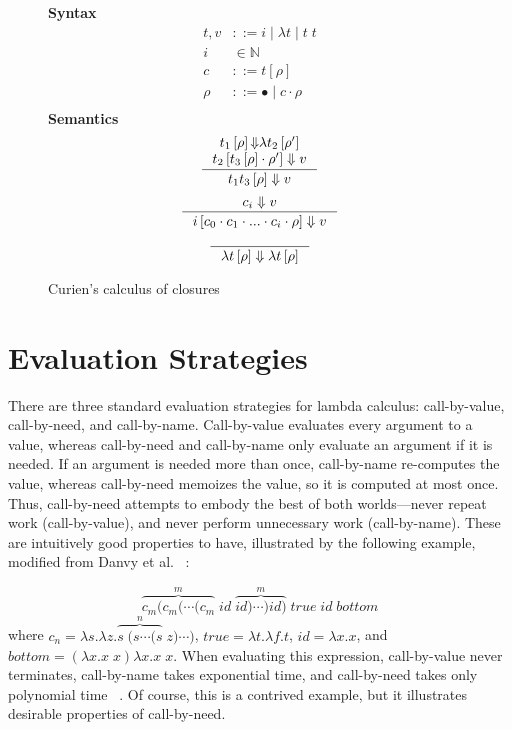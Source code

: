 \begin{figure}
\textbf{Syntax}
\begin{align*}
\tag{Term} t,v &::= i \; | \; \lambda t \; | \; t \; t  \\
\tag{Variable} i &\in \mathbb{N}  \\
\tag{Closure} c &::= t \left[\rho\right] \\
\tag{Environment} \rho &::= \bullet \; | \; c \cdot \rho \\
\end{align*}
\textbf{Semantics}
\begin{align*}
\inference
{t_1\left[\rho\right] {\Downarrow} \lambda t_2\left[\rho'\right] \\ 
 t_2\left[t_3\left[\rho\right] \cdot \rho'\right] \Downarrow v}
{t_1 t_3\left[\rho\right] \Downarrow v } 
\end{align*}
\begin{align*}
\inference
{c_i \Downarrow v}
{i \left[c_0 \cdot c_1 \cdot ... \cdot c_i \cdot \rho\right] \Downarrow v}
\end{align*}
\begin{align*}
\inference{}{\lambda t\left[\rho\right] \Downarrow \lambda t\left[\rho\right]}
\end{align*}
\caption{Curien's calculus of closures}
\label{fig:curien}
\end{figure}

\section{Evaluation Strategies} \label{sec:eval_strat}

There are three standard evaluation strategies for lambda calculus:
call-by-value, call-by-need, and call-by-name.  Call-by-value evaluates every argument
to a value, whereas call-by-need and call-by-name only evaluate an argument if
it is needed.  If an argument is needed more than once, call-by-name re-computes
the value, whereas call-by-need memoizes the value, so it is computed at most once.
Thus, call-by-need attempts to embody the best of both worlds---never repeat
work (call-by-value), and never perform unnecessary work (call-by-name). These
are intuitively good properties to have, illustrated by the following example,
modified from Danvy et al. ~\cite{danvy2013synthetic}:

$$ \overbrace{c_m (c_m (\cdots(c_m}^{m} \; \mathit{id} \;
\overbrace{\mathit{id})\cdots) \mathit{id})}^{m} \; \mathit{true} \;
\mathit{id} \; \mathit{bottom} $$ where $c_n = \lambda s.\lambda z.\overbrace{s
\; (s \cdots (s}^{n} \; z) \cdots) $, $\mathit{true} = \lambda t.\lambda f.t$,
$\mathit{id}=\lambda x.x$, and \\ $\mathit{bottom} = (\lambda x.x \; x) \lambda x.x \; x$.
When evaluating this expression, call-by-value never terminates, call-by-name
takes exponential time, and call-by-need takes only polynomial time
~\cite{danvy2013synthetic}. Of course, this is a contrived example, but it
illustrates desirable properties of call-by-need.

